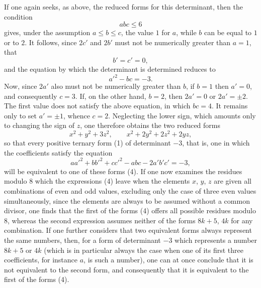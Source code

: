 \documentclass[11pt]{article}
\begin{document}
If one again seeks, as above, the reduced forms for this determinant, then the condition
\[
 abc\leq 6
\]
gives, under the assumption $a\leq b\leq c$, the value $1$ for $a$, while $b$ can be equal to $1$ or to $2$. It follows, since $2c'$ and $2b'$ must not be numerically greater than $a=1$, that
\[
 b'=c'=0,
\]
and the equation by which the determinant is determined reduces to
\[
 a'^2-bc=-3.
\]
Now, since $2a'$ also must not be numerically greater than $b$, if $b=1$ then $a'=0$, and consequently $c=3$. If, on the other hand, $b=2$, then $2a'=0$ or $2a'=\pm2$. The first value does not satisfy the above equation, in which $bc=4$. It remains only to set $a'=\pm1$, whence $c=2$. Neglecting the lower sign, which amounts only to changing the sign of $z$, one therefore obtains the two reduced forms
\begin{equation}\tag{4}
 x^2+y^2+3z^2,\qquad x^2+2y^2+2z^2+2yz,
\end{equation}
so that every positive ternary form (1) of determinant $-3$, that is, one in which the coefficients satisfy the equation
\begin{equation}\tag{5}
 aa'^2+bb'^2+cc'^2-abc-2a'b'c'=-3,
\end{equation}
will be equivalent to one of these forms (4). If one now examines the residues modulo $8$ which the expressions (4) leave when the elements $x$, $y$, $z$ are given all combinations of even and odd values, excluding only the case of three even values simultaneously, since the elements are always to be assumed without a common divisor, one finds that the first of the forms (4) offers all possible residues modulo $8$, whereas the second expression assumes neither of the forms $8k+5$, $4k$ for any combination. If one further considers that two equivalent forms always represent the same numbers, then, for a form of determinant $-3$ which represents a number $8k+5$ or $4k$ (which is in particular always the case when one of its first three coefficients, for instance $a$, is such a number), one can at once conclude that it is not equivalent to the second form, and consequently that it is equivalent to the first of the forms (4).
\end{document}
